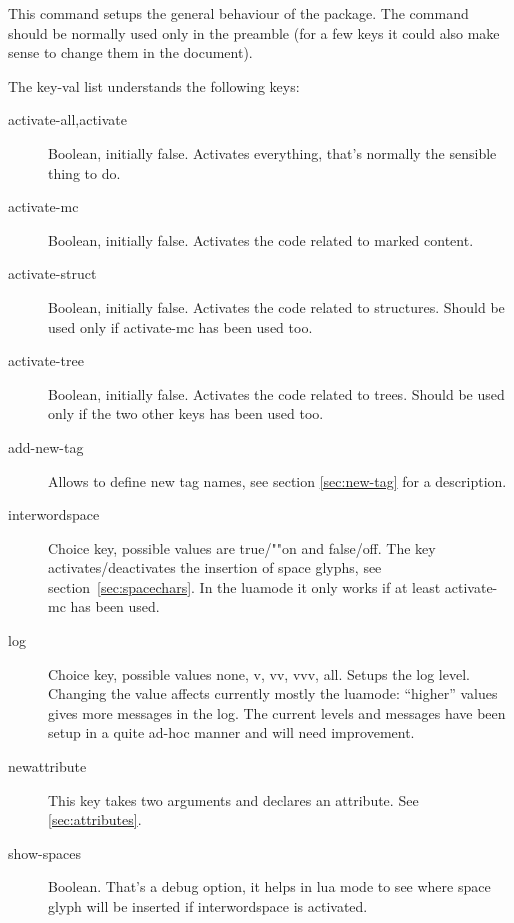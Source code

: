 \documentclass[DIV=12,parskip=half-,bibliography=totoc]{scrartcl}
\newcommand\PrintKeyName[1]{\textsf{#1}}
\begin{document}
This command setups the general behaviour of the package.
The command should be normally used only in the preamble
(for a few keys it could also make sense to change them in the document).

The key-val list understands the following keys:

\begin{description}
\item[\PrintKeyName{activate-all},\PrintKeyName{activate}]
 Boolean, initially false. Activates everything, that's normally the sensible thing to do.
\item[\PrintKeyName{activate-mc}]
 Boolean, initially false. Activates the code related to marked content.
\item[\PrintKeyName{activate-struct}]
 Boolean, initially false. Activates the code related to structures. Should be used only if \PrintKeyName{activate-mc} has been used too.
\item[\PrintKeyName{activate-tree}]
Boolean, initially false. Activates the code related to trees. Should be used only if the two other keys has been used too.
\item[\PrintKeyName{add-new-tag}]
 Allows to define new tag names, see section \ref{sec:new-tag} for a description.
\item[\PrintKeyName{interwordspace}]
 Choice key, possible values are \PrintKeyName{true}/""\PrintKeyName{on} and \PrintKeyName{false}/\PrintKeyName{off}. The key activates/deactivates the insertion of space glyphs, see section~\ref{sec:spacechars}. In the luamode it only works if at least \PrintKeyName{activate-mc} has been used.

\item[\PrintKeyName{log}]
 Choice key, possible values \PrintKeyName{none}, \PrintKeyName{v}, \PrintKeyName{vv}, \PrintKeyName{vvv},  \PrintKeyName{all}.  Setups the log level.  Changing the value affects currently mostly the luamode: \enquote{higher} values gives more messages in the log. The current levels and messages have been setup in a quite ad-hoc manner and will need improvement.
\item[\PrintKeyName{newattribute}]
 This key takes two arguments and declares an attribute. See \ref{sec:attributes}.
\item[\PrintKeyName{show-spaces}]

Boolean.
That's a debug option, it helps in lua mode to see where space glyph will be inserted if \PrintKeyName{interwordspace} is activated.


\end{description}
\end{document}
